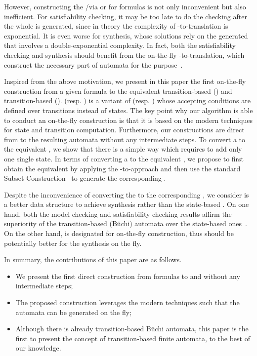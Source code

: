 However, constructing the \NFA/\DFA via \spot or \mona for \ltlf formulas is not only inconvenient but also inefficient. For \ltlf satisfiability checking, it may be too late to do the checking after the whole \NFA is generated, since in theory the complexity of \ltlf-to-\NFA translation is exponential. It is even worse for \ltlf synthesis, whose solutions rely on the generated \DFA that involves a double-exponential complexity. In fact, both the \ltlf satisfiability checking and \ltlf synthesis should benefit from the on-the-fly \ltlf-to-\DFA translation, which construct the necessary part of automata for the purpose~\cite{GPVW95}.  

Inspired from the above motivation, we present in this paper the first on-the-fly construction from a given \ltlf formula to the equivalent transition-based \NFA (\TNFA) and transition-based \DFA (\TDFA). \TNFA (resp. \TDFA) is a variant of \NFA (resp. \DFA) whose accepting conditions are defined over transitions instead of states. The key point why our algorithm is able to conduct an on-the-fly construction is that it is based on the modern \SAT techniques for state and transition computation. Furthermore, our constructions are direct from \ltlf to the resulting automata without any intermediate steps. To convert a \TNFA to the equivalent \NFA, we show that there is a simple way which requires to add only one single state. In terms of converting a \TDFA to the equivalent \DFA, we propose to first obtain the equivalent \NFA by applying the \TNFA-to-\NFA approach and then use the standard Subset Construction~\cite{RS59} to generate the corresponding \DFA.   

Despite the inconvenience of converting the \TDFA to the corresponding \DFA, we consider \TDFA is a better data structure to achieve \ltlf synthesis rather than the state-based \DFA. On one hand, both the \ltl model checking and \ltl satisfiability checking results affirm the superiority of the transition-based (B\"uchi) automata over the state-based ones~\cite{GL02}. On the other hand, \TDFA is designated for on-the-fly construction, thus should be potentially better for the synthesis on the fly. 

In summary, the contributions of this paper are as follows.
\begin{itemize}
	\item We present the first direct construction from \ltlf formulas to \TNFA and \TDFA without any intermediate steps;
	\item The proposed construction leverages the modern \SAT techniques such that the automata can be generated on the fly;
	\item Although there is already transition-based B\"uchi automata, this paper is the first to present the concept of transition-based finite automata, to the best of our knowledge.
\end{itemize}

